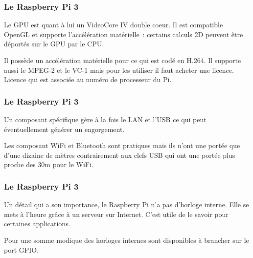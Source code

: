 \begin{frame}
\frametitle{Le Raspberry Pi 3}

Le GPU est quant à lui un VideoCore IV double coeur. Il est compatible OpenGL et supporte l'accélération matérielle~: certains calculs 2D peuvent être déportés sur le GPU par le CPU.

Il possède un accélération matérielle pour ce qui est codé en H.264. Il supporte aussi le MPEG-2 et le VC-1 mais pour les utiliser il faut acheter une licence. Licence qui est associée au numéro de processeur du Pi.
\end{frame}

\begin{frame}
\frametitle{Le Raspberry Pi 3}
Un composant spécifique gère à la fois le LAN et l'USB ce qui peut éventuellement générer un engorgement.

Les composant WiFi et Bluetooth sont pratiques mais ils n'ont une portée que d'une dizaine de mètres contrairement aux clefs USB qui ont une portée plus proche des 30m pour le WiFi.
\end{frame}

\begin{frame}
\frametitle{Le Raspberry Pi 3}

Un détail qui a son importance, le Raspberry Pi n'a pas d'horloge interne. Elle se mets à l'heure grâce à un serveur sur Internet. C'est utile de le savoir pour certaines applications.

Pour une somme modique des horloges internes sont disponibles à brancher sur le port GPIO.

\end{frame}
